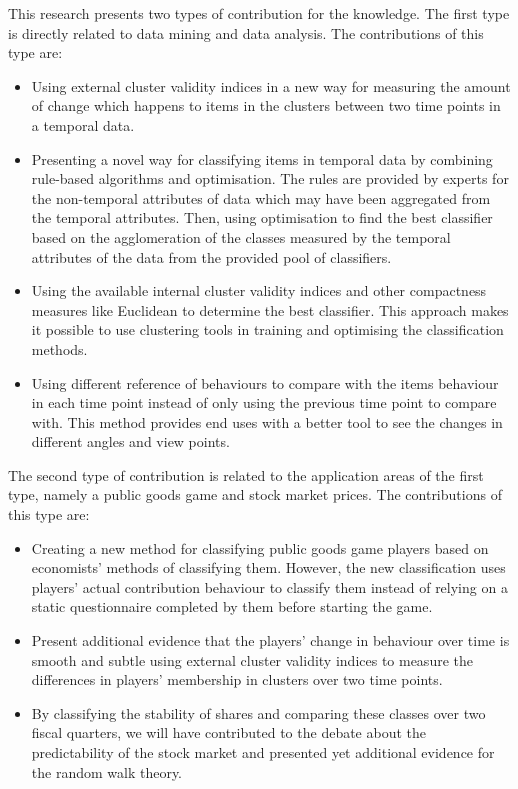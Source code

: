 This research presents two types of contribution for the knowledge. The first type is directly related to data mining and data analysis. The contributions of this type are:


\begin{itemize}
	
	\item Using external cluster validity indices in a new way for measuring the amount of change which happens to items in the clusters between two time points in a temporal data.
	
	\item Presenting a novel way for classifying items in temporal data by combining rule-based algorithms and optimisation. The rules are provided by experts for the non-temporal attributes of data which may have been aggregated from the temporal attributes. Then, using optimisation to find the best classifier based on the agglomeration of the classes measured by the temporal attributes of the data from the provided pool of classifiers.
	
	\item Using the available internal cluster validity indices and other compactness measures like Euclidean to determine the best classifier. This approach makes it possible to use clustering tools in training and optimising the classification methods. 
	
	\item Using different reference of behaviours to compare with the items behaviour in each time point instead of only using the previous time point to compare with. This method provides end uses with a better tool to see the changes in different angles and view points.
\end{itemize}


The second type of contribution is related to the application areas of the first type, namely a public goods game and stock market prices. The contributions of this type are: 

\begin{itemize}
	\item Creating a new method for classifying public goods game players based on economists' methods of classifying them. However, the new classification uses players' actual contribution behaviour to classify them instead of relying on a static questionnaire completed by them before starting the game.
	
	\item Present additional evidence that the players' change in behaviour over time is smooth and subtle using external cluster validity indices to measure the differences in players' membership in clusters over two time points.
	
	\item By classifying the stability of shares and comparing these classes over two fiscal quarters, we will have contributed to the debate about the predictability of the stock market and presented yet additional evidence for the random walk theory.
	

	
\end{itemize}

